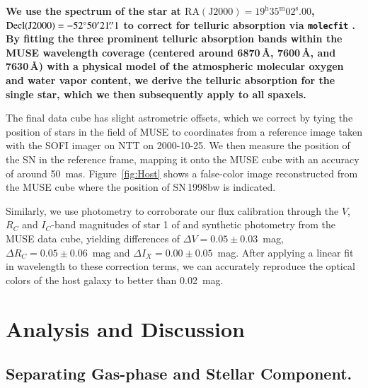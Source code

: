 \documentclass[traditabstract, referee]{aa}
\newcommand{\farc}{\hbox{$.\!\!^{\prime\prime}$}}
\begin{document}
\textbf{We use the spectrum of the star at $\mathrm{RA(J2000)=19^{h}35^{m}02^{s}.00}$, $\mathrm{Decl(J2000)} = -52^{\circ}50'21\farc{1}$ to correct for telluric absorption via \texttt{molecfit} \citep{2015A&A...576A..77S}. By fitting the three prominent telluric absorption bands within the MUSE wavelength coverage (centered around 6870\,\AA, 7600\,\AA, and 7630\,\AA) with a physical model of the atmospheric molecular oxygen and water vapor content, we derive the telluric absorption for the single star, which we then subsequently apply to all spaxels.}

The final data cube has slight astrometric offsets, which we correct by tying the position of stars in the field of MUSE to coordinates from a reference image taken with the SOFI imager on NTT on 2000-10-25. We then measure the position of the SN in the reference frame, mapping it onto the MUSE cube with an accuracy of around 50~mas. Figure~\ref{fig:Host} shows a false-color image reconstructed from the MUSE cube where the position of SN\,1998bw is indicated.

Similarly, we use photometry to corroborate our flux calibration through the $V$, $R_C$ and $I_C$-band magnitudes of star 1 of \citet{2011AJ....141..163C} and synthetic photometry from the MUSE data cube, yielding differences of $\Delta V = 0.05\pm0.03$~mag, $\Delta R_C = 0.05\pm0.06$~mag and $\Delta I_X = 0.00\pm0.05$~mag. After applying a linear fit in wavelength to these correction terms, we can accurately reproduce the optical colors of the host galaxy \citep{2005NewA...11..103S} to better than 0.02~mag.

\section{Analysis and Discussion}

\subsection{Separating Gas-phase and Stellar Component.}
\label{sec:stargas}
\end{document}
